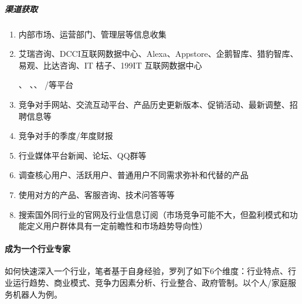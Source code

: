 \documentclass[letterpaper,10pt,english]{sphinxmanual}
\begin{document}
\subparagraph{渠道获取}
\label{\detokenize{chapter_knowledge/industry_analysis:id19}}\begin{enumerate}
%
\item {} 
内部市场、运营部门、管理层等信息收集

\item {} 
艾瑞咨询、DCCI互联网数据中心、Alexa、Appstore、企鹅智库、猎豹智库、易观、比达咨询、IT
桔子、199IT
互联网数据中心%
\begin{footnote}[510]\sphinxAtStartFootnote
{}
%
\end{footnote}、
、、 /等平台
%
\begin{footnote}[511]\sphinxAtStartFootnote
{}
%
\end{footnote}

\item {} 
竞争对手网站、交流互动平台、产品历史更新版本、促销活动、最新调整、招聘信息等

\item {} 
竞争对手的季度/年度财报

\item {} 
行业媒体平台新闻、论坛、QQ群等

\item {} 
调查核心用户、活跃用户、普通用户不同需求弥补和代替的产品

\item {} 
使用对方的产品、客服咨询、技术问答等等

\item {} 
搜索国外同行业的官网及行业信息订阅（市场竞争可能不大，但盈利模式和功能定义用户群体具有一定前瞻性和市场趋势导向性）

\end{enumerate}


\paragraph{成为一个行业专家}
\label{\detokenize{chapter_knowledge/industry_analysis:id20}}
如何快速深入一个行业，笔者基于自身经验，罗列了如下6个维度：行业特点、行业运行趋势、商业模式、竞争力因素分析、行业整合、政府管制。以个人/家庭服务机器人为例。
\end{document}
